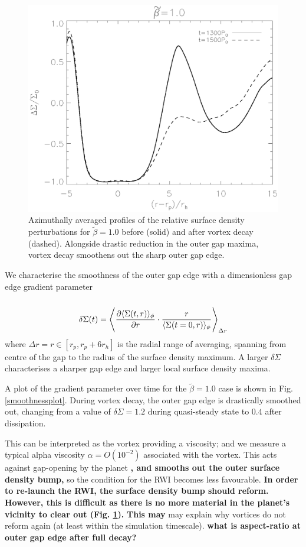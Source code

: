 \begin{figure}
  \includegraphics[width=\linewidth]{figures/gapchange}
  \caption{Azimuthally averaged profiles of the relative surface
    density perturbations for  $\tilde\beta=1.0$
    before (solid) and after vortex decay
    (dashed). Alongside drastic reduction in the outer gap maxima, vortex decay
    smoothens out the sharp outer gap edge.
    \label{gap_smoothed}} 
\end{figure}

We characterise the smoothness of the outer gap edge with a dimensionless
gap edge gradient parameter
\begin{align}
  \delta\Sigma(t)= \la \frac{\partial \langle \Sigma(t,r)
    \rangle_{\phi}}{\partial r} \cdot \frac{r}{\langle \Sigma(t=0,r)
    \rangle_{\phi}} \ra_{\Delta r}  
\end{align}
where $\Delta r = r\in [r_p,r_p + 6r_h]$ is the radial range of averaging, spanning
from centre of the gap to the radius of the surface density maximum.
A larger $\delta \Sigma$ characterises a sharper gap edge and  
larger local surface density maxima.   

A plot of the gradient parameter over time
for the $\tilde\beta=1.0$ case is shown in Fig. \ref{smoothnessplot}.
During vortex decay, the outer gap edge is 
drastically smoothed out, changing from a value of $\delta\Sigma=1.2$ during
quasi-steady state to $0.4$ after dissipation. 

This can be interpreted as the vortex providing a viscosity;  
and we measure a typical alpha viscosity $\alpha = O(10^{-2})$
associated with the vortex. This acts against gap-opening
by the planet {\bf, and smooths out the outer surface density bump,    
} so the condition for the RWI 
becomes less favourable. {\bf In
  order to re-launch the RWI, the surface density bump should
  reform. However, this is difficult as there is no more material
  in the planet's vicinity to clear out (Fig. \ref{gap_smoothed}).} {\bf This may} may explain
why vortices do  not reform again (at least within the simulation timescale). 
{\bf what is aspect-ratio at outer gap edge after full decay?}

